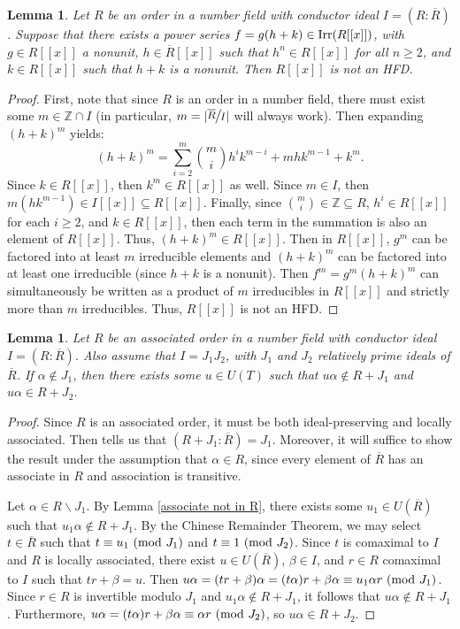 \documentclass[12pt]{amsart}
\newtheorem{lemma}[theorem]{Lemma}
\theoremstyle{definition}
\newcommand{\bZ}{\mathbb Z}
\newcommand{\Rbar}{{\overline{R}}}
\newcommand{\modulo}[1]{\textup{ (mod }#1)}
\newcommand{\Irr}{\textup{Irr}}
\newcommand{\quot}[2]{\large\sfrac{#1}{#2}\normalsize}
\begin{document}
\begin{lemma}
    \label{non-HFD construction}
    Let $R$ be an order in a number field with conductor ideal $I=(R:\Rbar)$. Suppose that there exists a power series $f=g(h+k)\in \Irr(R[[x]])$, with $g\in R[[x]]$ a nonunit, $h\in \Rbar[[x]]$ such that $h^n\in R[[x]]$ for all $n\geq 2$, and $k\in R[[x]]$ such that $h+k$ is a nonunit. Then $R[[x]]$ is not an HFD.
\end{lemma}

\begin{proof}
    First, note that since $R$ is an order in a number field, there must exist some $m\in \bZ\cap I$ (in particular, $m=|\quot{\Rbar}{I}|$ will always work). Then expanding $(h+k)^m$ yields:
    $$(h+k)^{m}=\sum_{i=2}^{m}\binom{m}{i}h^ik^{m-i}+mhk^{m-1}+k^{m}.$$
    Since $k\in R[[x]]$, then $k^{m}\in R[[x]]$ as well. Since $m\in I$, then $m(hk^{m-1})\in I[[x]]\subseteq R[[x]]$. Finally, since $\binom{m}{i}\in\bZ\subseteq R$, $h^i\in R[[x]]$ for each $i\geq 2$, and $k\in R[[x]]$, then each term in the summation is also an element of $R[[x]]$. Thus, $(h+k)^m\in R[[x]]$. Then in $R[[x]]$, $g^m$ can be factored into at least $m$ irreducible elements and $(h+k)^m$ can be factored into at least one irreducible (since $h+k$ is a nonunit). Then $f^m=g^m(h+k)^m$ can simultaneously be written as a product of $m$ irreducibles in $R[[x]]$ and strictly more than $m$ irreducibles. Thus, $R[[x]]$ is not an HFD.
\end{proof}

\begin{lemma}
    \label{associate in intermediate orders}
    Let $R$ be an associated order in a number field with conductor ideal $I=(R:\Rbar)$. Also assume that $I=J_1J_2$, with $J_1$ and $J_2$ relatively prime ideals of $\Rbar$. If $\alpha\notin J_1$, then there exists some $u\in U(T)$ such that $u\alpha\notin R+J_1$ and $u\alpha\in R+J_2$.
\end{lemma}

\begin{proof}
    Since $R$ is an associated order, it must be both ideal-preserving and locally associated. Then \cite[Theorem 4.5]{subringrelations} tells us that $(R+J_1:\Rbar)=J_1$. Moreover, it will suffice to show the result under the assumption that $\alpha\in R$, since every element of $\Rbar$ has an associate in $R$ and association is transitive.

    Let $\alpha\in R\backslash J_1$. By Lemma \ref{associate not in R}, there exists some $u_1\in U(\Rbar)$ such that $u_1\alpha\notin R+J_1$. By the Chinese Remainder Theorem, we may select $t\in \Rbar$ such that $t\equiv u_1\modulo{J_1}$ and $t\equiv 1\modulo{J_2}$. Since $t$ is comaximal to $I$ and $R$ is locally associated, there exist $u\in U(\Rbar)$, $\beta\in I$, and $r\in R$ comaximal to $I$ such that $tr+\beta=u$. Then $u\alpha=(tr+\beta)\alpha=(t\alpha)r+\beta\alpha\equiv u_1\alpha r\modulo{J_1}$. Since $r\in R$ is invertible modulo $J_1$ and $u_1\alpha\notin R+J_1$, it follows that $u\alpha\notin R+J_1$. Furthermore, $u\alpha=(t\alpha)r+\beta\alpha\equiv \alpha r\modulo{J_2}$, so $u\alpha\in R+J_2$.
\end{proof}
\end{document}

